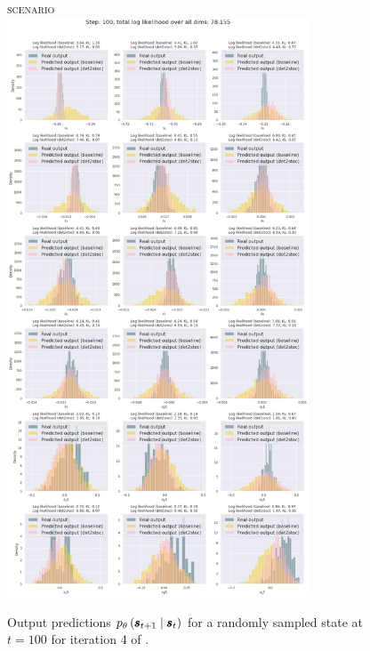 \begin{figure}
    \centering
    \textsc{\MakeLowercase{\ws{} scenario}}\\
    \medskip
    \includegraphics[width=0.8\textwidth,trim=0 0 0 70,clip]{img/windyslope/output/output_distribution_step100_delta_all}
    \caption{Output predictions $\ptheta \protect\given*{\vns}{\vs}$ for a randomly sampled state at $t=100$ for iteration 4 of \dettostoc{}.}
    \label{fig:output_distribution_step100_dettostoc}
\end{figure}


